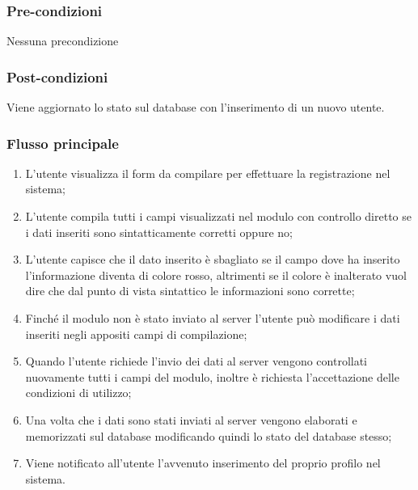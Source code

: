 	\subsubsection*{Pre-condizioni}
	Nessuna precondizione
	
	\subsubsection*{Post-condizioni}
	Viene aggiornato lo stato sul database con l'inserimento di un nuovo utente.
	
	\subsubsection*{Flusso principale}
	
		\begin{enumerate}
			
			\item
			L'utente visualizza il form da compilare per effettuare la registrazione nel sistema;
			
			\item
			L'utente compila tutti i campi visualizzati nel modulo con controllo diretto se i dati inseriti sono sintatticamente corretti oppure no;
			
			\item
			L'utente capisce che il dato inserito è sbagliato se il campo dove ha inserito l'informazione diventa di colore rosso, altrimenti se il colore è inalterato vuol dire che dal punto di vista sintattico le informazioni sono corrette;
			
			\item
			Finché il modulo non è stato inviato al server l'utente può modificare i dati inseriti negli appositi campi di compilazione;
			
			\item
			\label{fcu:effettua-registrazione}
			Quando l'utente richiede l'invio dei dati al server vengono controllati nuovamente tutti i campi del modulo, inoltre è richiesta l'accettazione delle condizioni di utilizzo;
			
			\item
			Una volta che i dati sono stati inviati al server vengono elaborati e memorizzati sul database modificando quindi lo stato del database stesso;
			
			\item
			Viene notificato all'utente l'avvenuto inserimento del proprio profilo nel sistema.
			
		\end{enumerate}
	
